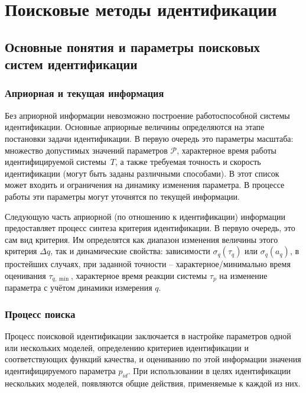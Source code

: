 \chapter{Поисковые методы идентификации}

\section{Основные понятия и параметры поисковых систем идентификации}

\subsection{Априорная и текущая информация}

Без априорной информации невозможно построение
работоспособной системы идентификации. Основные
априорные величины определяются на этапе постановки
задачи идентификации. В первую очередь это
параметры масштаба: множество допустимых
значений параметров \( \mathcal{P}\),
характерное время работы
идентифицируемой системы~$T$, а также
требуемая точность и скорость идентификации
(могут быть заданы различными способами).
В этот список может входить и ограничения на динамику изменения параметра.
В процессе работы эти параметры могут уточнятся по текущей информации.

Следующую часть априорной (по отношению к идентификации) информации
предоставляет процесс синтеза критерия идентификации.
В первую очередь, это сам вид критерия. Им определятся
как диапазон изменения величины этого критерия $\Delta q$, так и
динамические свойства:
зависимости $\sigma_q(\tau_q)$ или  $\sigma_q(a_q)$,
в простейших случаях, при заданной точности -- характерное/минимально время
оценивания \(\tau_{q,\min}\),
характерное время реакции системы $\tau_p$ на изменение
параметра с учётом динамики измерения \(q\).



\subsection{Процесс поиска}


Процесс поисковой идентификации заключается в настройке параметров одной
или нескольких моделей, определению критериев идентификации
и соответствующих функций качества, и оцениванию по этой информации
значения идентифицируемого параметра $p_{id}$.
При использовании в целях идентификации нескольких моделей,
появляются общие действия, применяемые к каждой из них.

